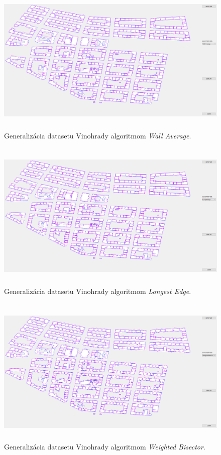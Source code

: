\documentclass[11pt]{article}
\begin{document}
\begin{figure}[h]
\captionsetup{justification=centering}
\centering
\includegraphics[width=14.65cm, height=7.2cm]{images/vinohrady_wa.png}
\caption{Generalizácia datasetu Vinohrady algoritmom \textit{Wall Average}.}
\label{fig:obr7}
\end{figure}
\newpage

\begin{figure}[h]
\captionsetup{justification=centering}
\centering
\includegraphics[width=14.65cm, height=7.2cm]{images/vinohrady_le.png}
\caption{Generalizácia datasetu Vinohrady algoritmom \textit{Longest Edge}.}
\label{fig:obr8}
\end{figure}

\begin{figure}[h]
\captionsetup{justification=centering}
\centering
\includegraphics[width=14.65cm, height=7.2cm]{images/vinohrady_bi.png}
\caption{Generalizácia datasetu Vinohrady algoritmom \textit{Weighted Bisector}.}
\label{fig:obr9}
\end{figure}
\end{document}
